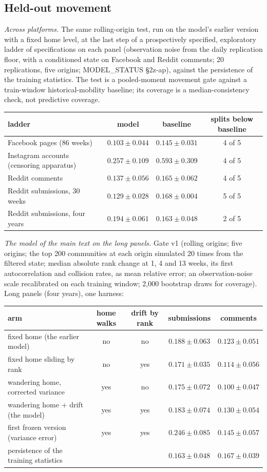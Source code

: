 \documentclass[10pt]{article}
\begin{document}
\subsection{Held-out movement}
\emph{Across platforms.} The same rolling-origin test, run on the model's earlier version with a fixed home level, at the last step of a prospectively specified, exploratory ladder of specifications on each panel (observation noise from the daily replication floor, with a conditioned state on Facebook and Reddit comments; 20 replications, five origins; MODEL\_STATUS \S2z-ap), against the persistence of the training statistics. The test is a pooled-moment movement gate against a train-window historical-mobility baseline; its coverage is a median-consistency check, not predictive coverage.
\begin{center}\small\begin{tabular}{lccc}
\toprule
ladder & model & baseline & splits below baseline\\
\midrule
Facebook pages (86 weeks) & $0.103\pm0.044$ & $0.145\pm0.031$ & 4 of 5\\
Instagram accounts (censoring apparatus) & $0.257\pm0.109$ & $0.593\pm0.309$ & 4 of 5\\
Reddit comments & $0.137\pm0.056$ & $0.165\pm0.062$ & 4 of 5\\
Reddit submissions, 30 weeks & $0.129\pm0.028$ & $0.168\pm0.004$ & 5 of 5\\
Reddit submissions, four years & $0.194\pm0.061$ & $0.163\pm0.048$ & 2 of 5\\
\bottomrule
\end{tabular}\end{center}
\emph{The model of the main text on the long panels.} Gate v1 (rolling origins; five origins; the top 200 communities at each origin simulated 20 times from the filtered state; median absolute rank change at 1, 4 and 13 weeks, its first autocorrelation and collision rates, as mean relative error; an observation-noise scale recalibrated on each training window; 2,000 bootstrap draws for coverage). Long panels (four years), one harness:
\begin{center}\small\begin{tabular}{lcccc}
\toprule
arm & home walks & drift by rank & submissions & comments\\
\midrule
fixed home (the earlier model) & no & no & $0.188\pm0.063$ & $0.123\pm0.051$\\
fixed home sliding by rank & no & yes & $0.171\pm0.035$ & $0.114\pm0.056$\\
wandering home, corrected variance & yes & no & $0.175\pm0.072$ & $0.100\pm0.047$\\
wandering home + drift (the model) & yes & yes & $0.183\pm0.074$ & $0.130\pm0.054$\\
first frozen version (variance error) & yes & yes & $0.246\pm0.085$ & $0.145\pm0.057$\\
persistence of the training statistics & & & $0.163\pm0.048$ & $0.167\pm0.039$\\
\bottomrule
\end{tabular}\end{center}
\end{document}
